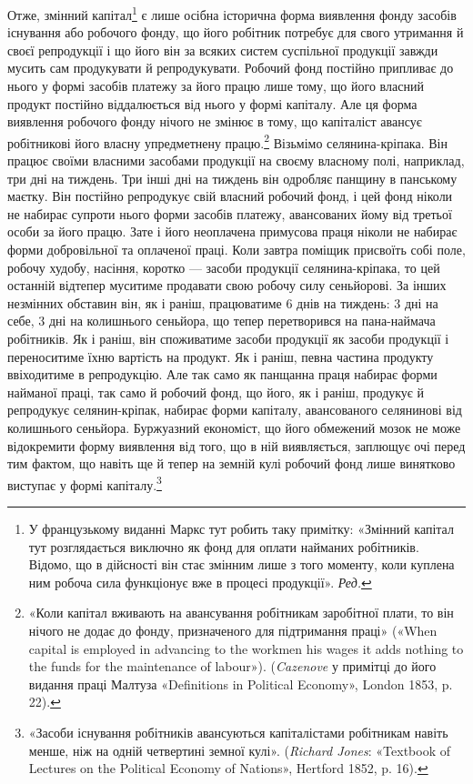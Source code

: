 Отже, змінний капітал\footnote*{
У французькому виданні Маркс тут робить таку примітку: «Змінний
капітал тут розглядається виключно як фонд для оплати найманих
робітників. Відомо, що в дійсності він стає змінним лише з того моменту,
коли куплена ним робоча сила функціонує вже в процесі продукції».
\emph{Ред.}
} є лише осібна історична форма виявлення
фонду засобів існування або робочого фонду, що його
робітник потребує для свого утримання й своєї репродукції і
що його він за всяких систем суспільної продукції завжди мусить
сам продукувати й репродукувати. Робочий фонд постійно
припливає до нього у формі засобів платежу за його працю лише
тому, що його власний продукт постійно віддалюється від нього
у формі капіталу. Але ця форма виявлення робочого фонду нічого
не змінює в тому, що капіталіст авансує робітникові його
власну упредметнену працю.\footnote{
«Коли капітал вживають на авансування робітникам заробітної
плати, то він нічого не додає до фонду, призначеного для підтримання
праці» («When capital is employed in advancing to the workmen his wages
it adds nothing to the funds for the maintenance of labour»). (\emph{Cazenove}
у примітці до його видання праці Малтуза «Definitions in Political Economy»,
London 1853, p. 22).
} Візьмімо селянина-кріпака. Він
працює своїми власними засобами продукції на своєму власному
полі, наприклад, три дні на тиждень. Три інші дні на тиждень
він одробляє панщину в панському маєтку. Він постійно репродукує
свій власний робочий фонд, і цей фонд ніколи не набирає
супроти нього форми засобів платежу, авансованих йому
від третьої особи за його працю. Зате і його неоплачена примусова
праця ніколи не набирає форми добровільної та оплаченої
праці. Коли завтра поміщик присвоїть собі поле, робочу худобу,
насіння, коротко — засоби продукції селянина-кріпака,
то цей останній відтепер муситиме продавати свою робочу силу
сеньйорові. За інших незмінних обставин він, як і раніш, працюватиме
6 днів на тиждень: 3 дні на себе, 3 дні на колишнього
сеньйора, що тепер перетворився на пана-наймача робітників.
Як і раніш, він споживатиме засоби продукції як засоби продукції
і переноситиме їхню вартість на продукт. Як і раніш, певна
частина продукту ввіходитиме в репродукцію. Але так само як
панщанна праця набирає форми найманої праці, так само й робочий
фонд, що його, як і раніш, продукує й репродукує селянин-кріпак,
набирає форми капіталу, авансованого селянинові від
колишнього сеньйора. Буржуазний економіст, що його обмежений
мозок не може відокремити форму виявлення від того, що
в ній виявляється, заплющує очі перед тим фактом, що навіть
ще й тепер на земній кулі робочий фонд лише винятково виступає
у формі капіталу.\footnote{
«Засоби існування робітників авансуються капіталістами робітникам
навіть менше, ніж на одній четвертині земної кулі». (\emph{Richard
Jones}: «Textbook of Lectures on the Political Economy of Nations», Hertford
1852, p. 16).
}

